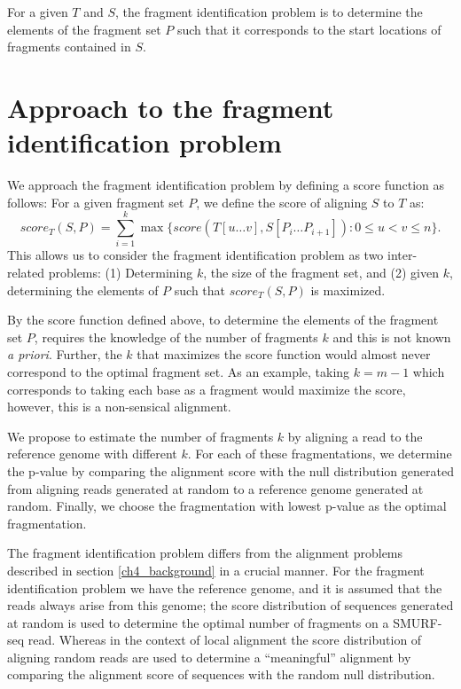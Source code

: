 For a given $T$ and $S$, the fragment identification problem is to
determine the elements of the fragment set $P$ such that it corresponds
to the start locations of fragments contained in $S$.



\section{Approach to the fragment identification problem}
We approach the fragment identification problem by defining a score
function as follows:
For a given fragment set $P$, we define the score of aligning $S$ to $T$
as: \[score_T(S,P) = \sum_{i=1}^{k} \max\{score(T[u \dots v], S[P_i
\dots P_{i+1}]): 0 \leq u < v \leq n\}.\]
%
This allows us to consider the fragment identification problem as two
inter-related problems: (1) Determining $k$, the size of the fragment
set, and (2) given $k$, determining the elements of $P$ such that
$score_T(S, P)$ is maximized.

By the score function defined above, to determine the elements of the
fragment set $P$, requires the knowledge of the number of fragments $k$
and this is not known \textit{a priori}. Further, the $k$ that maximizes
the score function would almost never correspond to the optimal fragment
set. As an example, taking $k=m-1$ which corresponds to taking each base
as a fragment would maximize the score, however, this is a non-sensical
alignment.

We propose to estimate the number of fragments $k$ by aligning a read
to the reference genome with different $k$. For each of these
fragmentations, we determine the p-value by comparing the alignment
score with the null distribution generated from aligning reads generated
at random to a reference genome generated at random. Finally, we choose
the fragmentation with lowest p-value as the optimal fragmentation.

The fragment identification problem differs from the alignment problems
described in section \ref{ch4_background} in a crucial manner. For the
fragment identification problem we have the reference genome, and it is
assumed that the reads always arise from this genome; the score
distribution of sequences generated at random is used to determine the
optimal number of fragments on a SMURF-seq read. Whereas in the context
of local alignment the score distribution of aligning random reads are
used to determine a ``meaningful'' alignment by comparing the alignment
score of sequences with the random null distribution.


